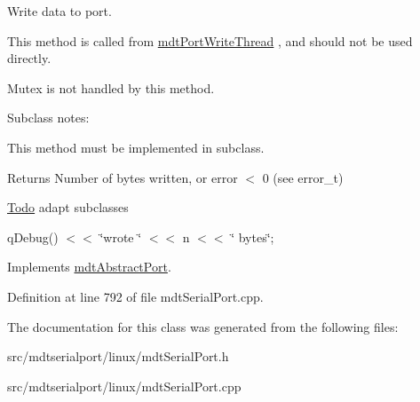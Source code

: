 Write data to port. 

This method is called from \hyperlink{classmdt_port_write_thread}{mdtPortWriteThread} , and should not be used directly.

Mutex is not handled by this method.

Subclass notes:\par
 This method must be implemented in subclass.\par


\begin{DoxyReturn}{Returns}
Number of bytes written, or error $<$ 0 (see error\_\-t)
\end{DoxyReturn}
\begin{Desc}
\item[\hyperlink{todo__todo000015}{Todo}]adapt subclasses \end{Desc}


qDebug() $<$$<$ \char`\"{}wrote \char`\"{} $<$$<$ n $<$$<$ \char`\"{} bytes\char`\"{}; 



Implements \hyperlink{classmdt_abstract_port_a64d4802975a76474b9196c91f57a6d90}{mdtAbstractPort}.



Definition at line 792 of file mdtSerialPort.cpp.



The documentation for this class was generated from the following files:\begin{DoxyCompactItemize}
\item 
src/mdtserialport/linux/mdtSerialPort.h\item 
src/mdtserialport/linux/mdtSerialPort.cpp\end{DoxyCompactItemize}
